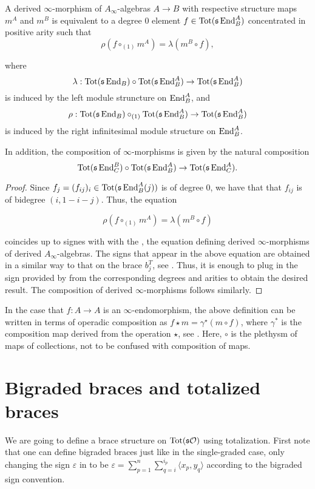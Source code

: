 \documentclass[Thesis.tex]{subfiles}
\begin{document}
\begin{lem}\label{dinfinitymorphism}
A derived $\infty$-morphism of $A_\infty$-algebras $A\to B$ with respective structure maps $m^A$ and $m^B$ is equivalent to a degree 0 element $f\in\operatorname{Tot}(\mathfrak{s}\operatorname{End}^A_B)$ concentrated in positive arity such that \[\rho(f\circ_{(1)}m^A)=\lambda(m^B\circ f),\] 

where \[\lambda:\operatorname{Tot}(\mathfrak{s}\operatorname{End}_B)\circ \operatorname{Tot}(\mathfrak{s}\operatorname{End}^A_B)\to \operatorname{Tot}(\mathfrak{s}\operatorname{End}^A_B)\] is induced by the left module struncture on $\operatorname{End}^A_B$, and \[\rho:\operatorname{Tot}(\mathfrak{s}\operatorname{End}_B)\circ_{(1)}\operatorname{Tot}(\mathfrak{s}\operatorname{End}^A_B)\to \operatorname{Tot}(\mathfrak{s}\operatorname{End}^A_B)\] is induced by the right infinitesimal module structure on $\operatorname{End}^A_B$. 

In addition, the composition of $\infty$-morphisms is given by the natural composition \[\operatorname{Tot}(\mathfrak{s}\operatorname{End}^B_C)\circ \operatorname{Tot}(\mathfrak{s}\operatorname{End}^A_B)\to \operatorname{Tot}(\mathfrak{s}\operatorname{End}^A_C).\]
\end{lem}
\begin{proof}
Since $f_j=(f_{ij})_i\in\operatorname{Tot}(\mathfrak{s}\operatorname{End}^A_B(j))$ is of degree $0$, we have that that $f_{ij}$ is of bidegree $(i,1-i-j)$. Thus, the equation

\[\rho(f\circ_{(1)}m^A)=\lambda(m^B\circ f)\] 

coincides up to signes with with the , the equation defining derived $\infty$-morphisms of derived $A_\infty$-algebras. The signs that appear in the above equation are obtained in a similar way to that on the brace $b_j^T$, see . Thus, it is enough to plug in the sign provided by  from the corresponding degrees and arities to obtain the desired result. The composition of derived $\infty$-morphisms follows similarly.
\end{proof}

In the case that $f:A\to A$ is an $\infty$-endomorphism, the above definition can be written in terms of operadic composition as $f\star m=\gamma^\star(m\circ f)$, where $\gamma^*$ is the composition map derived from the operation $\star$, see . Here, $\circ$ is the plethysm of maps of collections, not to be confused with composition of maps. 


\section{Bigraded braces and totalized braces}\label{sectionbibraces}
We are going to define a brace structure on $\operatorname{Tot}(\mathfrak{s}{\mathcal O})$ using totalization. First note that one can define bigraded braces just like in the single-graded case, only changing the sign $\varepsilon$ in  to be $\varepsilon=\sum_{p=1}^n\sum_{q=i}^{i_p}\langle x_p,y_q\rangle$ according to the bigraded sign convention.
\end{document}
